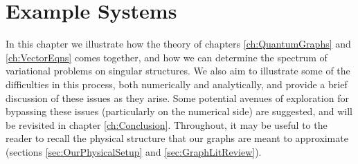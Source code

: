 \chapter{Example Systems} \label{ch:ExampleSystems}
In this chapter we illustrate how the theory of chapters \ref{ch:QuantumGraphs} and \ref{ch:VectorEqns} comes together, and how we can determine the spectrum of variational problems on singular structures.
We also aim to illustrate some of the difficulties in this process, both numerically and analytically, and provide a brief discussion of these issues as they arise.
Some potential avenues of exploration for bypassing these issues (particularly on the numerical side) are suggested, and will be revisited in chapter \ref{ch:Conclusion}.
Throughout, it may be useful to the reader to recall the physical structure that our graphs are meant to approximate (sections \ref{sec:OurPhysicalSetup} and \ref{sec:GraphLitReview}).

